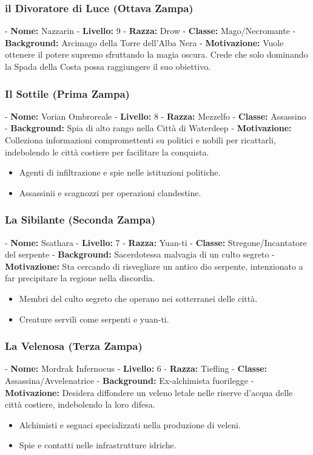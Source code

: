 \documentclass{article}
\begin{document}
              \subsubsection{il Divoratore di Luce (Ottava Zampa) }
   - \textbf{Nome:} Nazzarin
   - \textbf{Livello:} 9
   - \textbf{Razza:} Drow
   - \textbf{Classe:} Mago/Necromante
   - \textbf{Background:} Arcimago della Torre dell'Alba Nera
   - \textbf{Motivazione:} Vuole ottenere il potere supremo sfruttando la magia oscura. Crede che solo dominando la Spada della Costa possa raggiungere il suo obiettivo.

              \subsubsection{Il Sottile (Prima Zampa)}
   - \textbf{Nome:} Vorian Ombroreale
   - \textbf{Livello:} 8
   - \textbf{Razza:} Mezzelfo
   - \textbf{Classe:} Assassino
   - \textbf{Background:} Spia di alto rango nella Città di Waterdeep
   - \textbf{Motivazione:} Colleziona informazioni compromettenti su politici e nobili per ricattarli, indebolendo le città costiere per facilitare la conquista.
   \begin{itemize}
    \item Agenti di infiltrazione e spie nelle istituzioni politiche.
    \item Assassinii e scagnozzi per operazioni clandestine.
  \end{itemize}

              \subsubsection{ La Sibilante (Seconda Zampa)}
   - \textbf{Nome:} Ssathara
   - \textbf{Livello:} 7
   - \textbf{Razza:} Yuan-ti
   - \textbf{Classe:} Stregone/Incantatore del serpente
   - \textbf{Background:} Sacerdotessa malvagia di un culto segreto
   - \textbf{Motivazione:} Sta cercando di risvegliare un antico dio serpente, intenzionato a far precipitare la regione nella discordia.
   \begin{itemize}
    \item Membri del culto segreto che operano nei sotterranei delle città.
    \item Creature servili come serpenti e yuan-ti.
\end{itemize}
              \subsubsection{ La Velenosa (Terza Zampa)}
   - \textbf{Nome:} Mordrak Infernocus
   - \textbf{Livello:} 6
   - \textbf{Razza:} Tiefling
   - \textbf{Classe:} Assassina/Avvelenatrice
   - \textbf{Background:} Ex-alchimista fuorilegge
   - \textbf{Motivazione:} Desidera diffondere un veleno letale nelle riserve d'acqua delle città costiere, indebolendo la loro difesa.
   \begin{itemize}
    \item Alchimisti e seguaci specializzati nella produzione di veleni.
    \item Spie e contatti nelle infrastrutture idriche.
\end{itemize}
\end{document}
